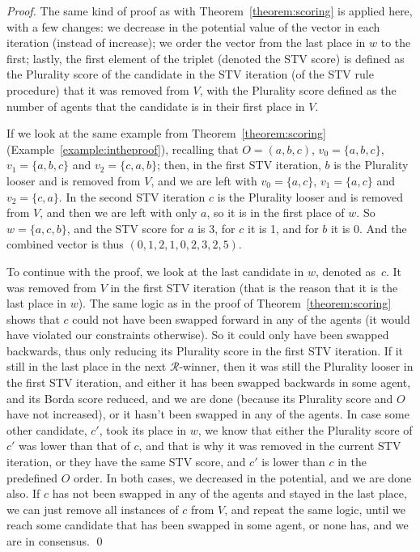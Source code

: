 \documentclass[runningheads,envcountsame]{llncs}
\begin{document}
\begin{proof}
  The same kind of proof as with Theorem~\ref{theorem:scoring} is applied here, with a few changes: we decrease in the potential value of the vector in each iteration (instead of increase); we order the vector from the last place in $w$ to the first; lastly, the first element of the triplet (denoted the STV score) is defined as the Plurality score of the candidate in the STV iteration (of the STV rule procedure) that it was removed from $V$, with the Plurality score defined as the number of agents that the candidate is in their first place in $V$.
  
  If we look at the same example from Theorem~\ref{theorem:scoring} (Example~\ref{example:intheproof}), recalling that $O = (a,b,c)$, $v_0 = \{a, b, c\}$, $v_1 = \{a, b, c\}$ and $v_2 = \{c, a, b\}$; then, in the first STV iteration, $b$ is the Plurality looser and is removed from $V$, and we are left with $v_0 = \{a, c\}$, $v_1 = \{a, c\}$ and $v_2 = \{c, a\}$. In the second STV iteration $c$ is the Plurality looser and is removed from $V$, and then we are left with only $a$, so it is in the first place of $w$. So $w=\{a, c, b\}$, and the STV score for $a$ is 3, for $c$ it is 1, and for $b$ it is 0. And the combined vector is thus $(0, 1, 2, 1, 0, 2, 3, 2, 5)$.
  
  To continue with the proof, we look at the last candidate in $w$, denoted as~$c$. It was removed from $V$ in the first STV iteration (that is the reason that it is the last place in $w$). The same logic as in the proof of Theorem~\ref{theorem:scoring} shows that $c$ could not have been swapped forward in any of the agents (it would have violated our constraints otherwise). So it could only have been swapped backwards, thus only reducing its Plurality score in the first STV iteration. If it still in the last place in the next $\mathcal{R}$-winner, then it was still the Plurality looser in the first STV iteration, and either it has been swapped backwards in some agent, and its Borda score reduced, and we are done (because its Plurality score and $O$ have not increased), or it hasn't been swapped in any of the agents. In case some other candidate, $c'$, took its place in $w$, we know that either the Plurality score of $c'$ was lower than that of $c$, and that is why it was removed in the current STV iteration, or they have the same STV score, and $c'$ is lower than $c$ in the predefined $O$ order. In both cases, we decreased in the potential, and we are done also.
  If $c$ has not been swapped in any of the agents and stayed in the last place, we can just remove all instances of $c$ from $V$, and repeat the same logic, until we reach some candidate that has been swapped in some agent, or none has, and we are in consensus.
\qed\end{proof}
\end{document}

